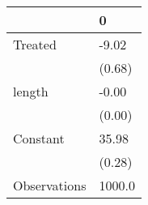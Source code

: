 \begin{tabular}{ll}
\toprule
{} &       0 \\
\midrule
Treated      &   -9.02 \\
             &  (0.68) \\
length       &   -0.00 \\
             &  (0.00) \\
Constant     &   35.98 \\
             &  (0.28) \\
Observations &  1000.0 \\
\bottomrule
\end{tabular}
